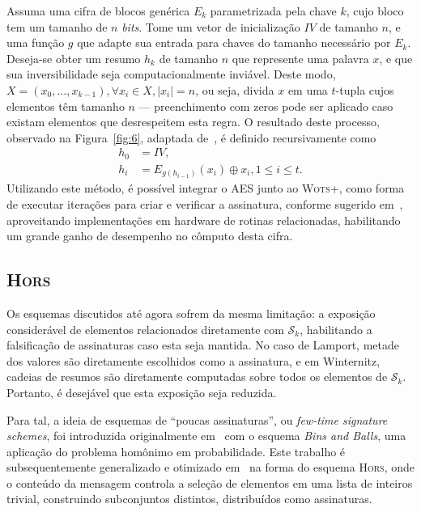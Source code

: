 \documentclass{ufsctex/ufsctex}
\newcommand{\sk}{\mathcal{S}_k}
\newcommand{\length}[1]{\vert{} #1 \vert{}}
\newcommand{\wotsplus}{\textsc{Wots+}}
\newcommand{\hors}{\textsc{Hors}}
\begin{document}
Assuma uma cifra de blocos genérica $E_{k}$ parametrizada pela chave $k$, cujo
bloco tem um tamanho de $n$ \emph{bits}. Tome um vetor de inicialização $IV$ de
tamanho $n$, e uma função $g$ que adapte sua entrada para chaves do tamanho
necessário por $E_{k}$. Deseja-se obter um resumo $h_k$ de tamanho $n$ que
represente uma palavra $x$, e que sua inversibilidade seja computacionalmente
inviável. Deste modo, $X = (x_0, \dots, x_{k - 1}), \forall x_i \in X,
\length{x_i} = n$, ou seja, divida $x$ em uma $t$-tupla cujos elementos têm
tamanho $n$ --- preenchimento com zeros pode ser aplicado caso existam
elementos que desrespeitem esta regra. O resultado deste processo, observado na
Figura~\ref{fig:6}, adaptada de~\cite{Jean:misc:2016:apr}, é definido
recursivamente como
\begin{equation}
  \begin{split}
    h_0 &= IV, \\
    h_i &= E_{g(h_{i-1})}(x_i) \oplus x_i, 1 \leq i \leq t.
  \end{split}
\end{equation}
Utilizando este método, é possível integrar o AES junto ao \wotsplus{}, como
forma de executar iterações para criar e verificar a assinatura, conforme
sugerido em~\cite[Subseção 4.1]{Huelsing:inproc:2013:jun}, aproveitando
implementações em hardware de rotinas relacionadas, habilitando um grande ganho
de desempenho no cômputo desta cifra.

\subsection{\hors{}}\label{subsection:hors}

Os esquemas discutidos até agora sofrem da mesma limitação: a exposição
considerável de elementos relacionados diretamente com $\sk{}$, habilitando a
falsificação de assinaturas caso esta seja mantida. No caso de Lamport, metade
dos valores são diretamente escolhidos como a assinatura, e em Winternitz,
cadeias de resumos são diretamente computadas sobre todos os elementos de
$\sk{}$. Portanto, é desejável que esta exposição seja reduzida.

Para tal, a ideia de esquemas de ``poucas assinaturas'', ou \emph{few-time
signature schemes}, foi introduzida originalmente
em~\cite{Perrig:inproc:2001:nov} com o esquema \emph{Bins and Balls}, uma
aplicação do problema homônimo em probabilidade. Este trabalho é
subsequentemente generalizado e otimizado em~\cite{Reyzin:inproc:2002:jul} na
forma do esquema \hors{}\sigla{\hors{}}{\emph{Hash to Obtain Random Subset}},
onde o conteúdo da mensagem controla a seleção de elementos em uma lista de
inteiros trivial, construindo subconjuntos distintos, distribuídos como
assinaturas.
\end{document}
